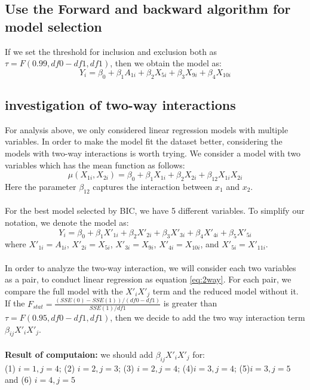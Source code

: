 \documentclass[11pt, oneside]{article}   	%
\begin{document}
\subsection{Use the Forward and backward algorithm for model selection}
If we set the threshold for inclusion and exclusion both as $\tau=F(0.99,df0-df1,df1)$, then we obtain the model as:
\begin{equation}\label{eq:2way}
Y_i=\beta_0+\beta_1A_{1i}+\beta_2X_{5i}+\beta_3X_{9i}+\beta_4X_{10i}
\end{equation}
\subsection{investigation of two-way interactions}
For analysis above, we only considered linear regression models with multiple variables. In order to make the model fit the dataset better, considering the models with two-way interactions is worth trying.
We consider a model with two variables which has the mean function as follows:
\begin{equation}
\mu(X_{1i},X_{2i})=\beta_0+\beta_1X_{1i}+\beta_2X_{2i}+\beta_{12}X_{1i}X_{2i}
\end{equation}
Here the parameter $\beta_{12}$ captures the interaction between $x_1$ and $x_2$.\\
\\
For the best model selected by BIC, we have 5 different variables. To simplify our notation, we denote the model as:
\begin{equation}
Y_i=\beta_0+\beta_1X'_{1i}+\beta_2X'_{2i}+\beta_3X'_{3i}+\beta_4X'_{4i}+\beta_5X'_{5i}
\end{equation}
where $X'_{1i}=A_{1i}$, $X'_{2i}=X_{5i}$, $X'_{3i}=X_{9i}$, $X'_{4i}=X_{10i}$, and $X'_{5i}=X'_{11i}$.\\
\\
In order to analyze the two-way interaction, we will consider each two variables as a pair, to conduct linear regression as equation \eqref{eq:2way}. For each pair, we compare the full model with the $X'_iX'_j$ term and the reduced model without it. If the $F_{stat}=\frac{(SSE(0)-SSE(1))/(df0-df1)}{SSE(1)/df1}$ is greater than $\tau=F(0.95,df0-df1,df1)$, then we decide to add the two way interaction term $\beta_{ij}X'_iX'_j$.\\
\\
\textbf{Result of computaion:} we should add  $\beta_{ij}X'_iX'_j$ for: \\
(1) $i=1,j=4$; (2) $i=2,j=3$; (3) $i=2,j=4$; (4)$i=3, j=4$; (5)$i=3,j=5$ and (6) $i=4,j=5$\\
\end{document}
